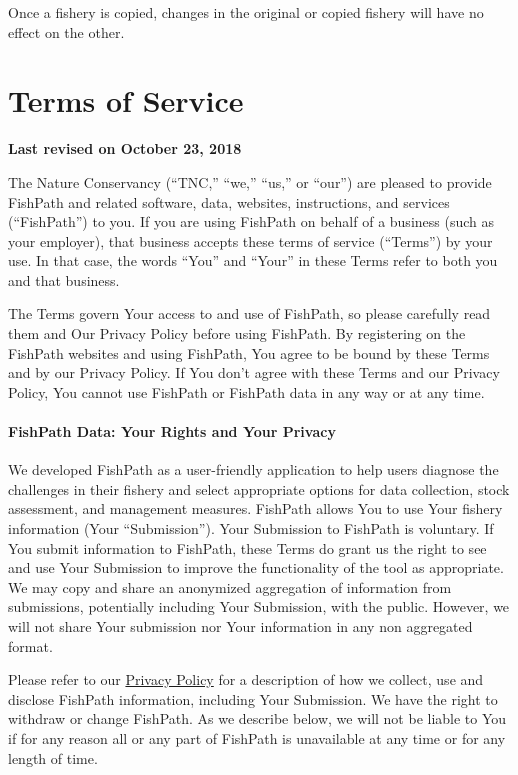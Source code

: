 \documentclass[11pt,]{book}
\begin{document}
Once a fishery is copied, changes in the original or copied fishery will have no effect on the other.

\hypertarget{terms}{%
\chapter{Terms of Service}\label{terms}}

\textbf{Last revised on October 23, 2018}

The Nature Conservancy (``TNC,'' ``we,'' ``us,'' or ``our'') are pleased to provide FishPath and related software, data, websites, instructions, and services (``FishPath'') to you. If you are using FishPath on behalf of a business (such as your employer), that business accepts these terms of service (``Terms'') by your use. In that case, the words ``You'' and ``Your'' in these Terms refer to both you and that business.

The Terms govern Your access to and use of FishPath, so please carefully read them and Our Privacy Policy before using FishPath. By registering on the FishPath websites and using FishPath, You agree to be bound by these Terms and by our Privacy Policy. If You don't agree with these Terms and our Privacy Policy, You cannot use FishPath or FishPath data in any way or at any time.

\hypertarget{fishpath-data-your-rights-and-your-privacy}{%
\subsubsection*{FishPath Data: Your Rights and Your Privacy}\label{fishpath-data-your-rights-and-your-privacy}}

We developed FishPath as a user-friendly application to help users diagnose the challenges in their fishery and select appropriate options for data collection, stock assessment, and management measures. FishPath allows You to use Your fishery information (Your ``Submission''). Your Submission to FishPath is voluntary. If You submit information to FishPath, these Terms do grant us the right to see and use Your Submission to improve the functionality of the tool as appropriate. We may copy and share an anonymized aggregation of information from submissions, potentially including Your Submission, with the public. However, we will not share Your submission nor Your information in any non aggregated format.

Please refer to our \href{https://www.nature.org/en-us/about-us/who-we-are/accountability/privacy-policy/}{Privacy Policy} for a description of how we collect, use and disclose FishPath information, including Your Submission. We have the right to withdraw or change FishPath. As we describe below, we will not be liable to You if for any reason all or any part of FishPath is unavailable at any time or for any length of time.
\end{document}
